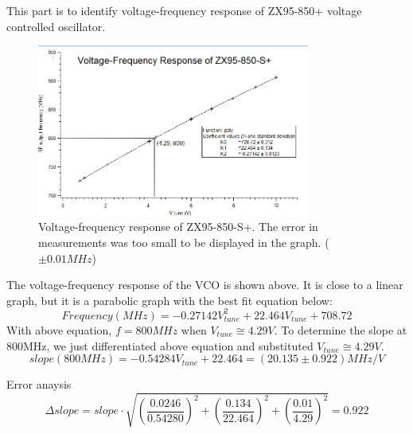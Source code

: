 This part is to identify voltage-frequency response of ZX95-850+ voltage controlled oscillator. \\

\begin{figure}[h]
\centering
\includegraphics[width=0.8\textwidth]{figures/partA1.png}
\caption{Voltage-frequency response of ZX95-850-S+. The error in measurements was too small to be displayed in the graph. ($\pm 0.01MHz$)}
\end{figure}
The voltage-frequency response of the VCO is shown above. It is close to a linear graph, but it is a parabolic graph with the best fit equation below:
\begin{equation}
    Frequency(MHz)=-0.27142V_{tune}^{2}+22.464V_{tune}+708.72
\end{equation}
With above equation, $f=800MHz$ when $V_{tune}\cong 4.29V$. To determine the slope at 800MHz, we just differentiated above equation and substituted $V_{tune}\cong 4.29V$.
\begin{equation}
    slope(800MHz) = -0.54284V_{tune}+22.464=(20.135 \pm 0.922)MHz/V
\end{equation}

Error anaysis
\begin{equation}
    \Delta slope=slope\cdot \sqrt{(\frac{0.0246}{0.54280})^{2}+(\frac{0.134}{22.464})^{2}+(\frac{0.01}{4.29})^{2}}=0.922
\end{equation}

